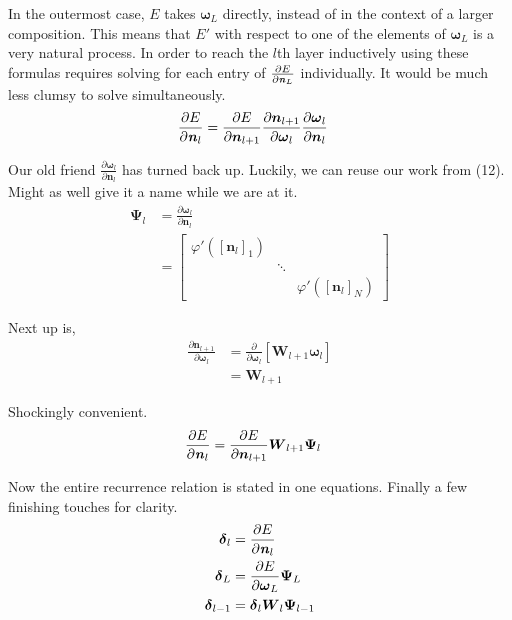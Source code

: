 \documentclass[12pt,letterpaper]{article}
\begin{document}
In the outermost case, $E$ takes $\boldsymbol{\omega}_L$ directly, instead of in the context of a larger composition.  This means that $E'$ with respect to one of the elements of $\boldsymbol{\omega}_L$ is a very natural process.  In order to reach the $l$th layer inductively using these formulas requires solving for each entry of 
$\frac{\partial E}{ \partial \textbf{\textit{n}}_L }$
individually.  It would be much less clumsy to solve simultaneously.
\begin{align}
\frac{\partial E}{ \partial \textbf{\textit{n}}_l } 
&= 
\frac{\partial E}{\partial \boldsymbol{n}_{l+1}}
\frac{\partial \boldsymbol{n}_{l+1}}{ \partial \boldsymbol{\omega}_l }
\frac{\partial \boldsymbol{\omega}_l }{ \partial \boldsymbol{n}_l }
\end{align}

Our old friend 
$\frac{\partial \boldsymbol{\omega}_l }{ \partial \boldsymbol{n}_l }$
has turned back up.  Luckily, we can reuse our work from (12).  Might as well give it a name while we are at it.
\begin{align}
\boldsymbol{\Psi}_l
&= 
\frac{\partial \boldsymbol{\omega}_l }{ \partial \boldsymbol{n}_l } \\
&=
\begin{bmatrix}
\varphi'(\left[\boldsymbol{n}_l\right]_1) & \\ 
& \ddots &\\ 
& & \varphi'(\left[\boldsymbol{n}_l\right]_N)
\end{bmatrix}
\end{align}

Next up is,
\begin{align}
\frac{\partial \boldsymbol{n}_{l+1}}{ \partial \boldsymbol{\omega}_l }
&= 
\frac{\partial }{ \partial \boldsymbol{\omega}_l } 
\left[ 
\boldsymbol{W}_{l+1} \boldsymbol{\omega}_l
\right] \\
&=
\boldsymbol{W}_{l+1}
\end{align}

Shockingly convenient.
\begin{align}
\frac{\partial E}{ \partial \textbf{\textit{n}}_l } 
&= 
\frac{\partial E}{\partial \boldsymbol{n}_{l+1}}
\boldsymbol{W}_{l+1}
\boldsymbol{\Psi}_l
\end{align}

Now the entire recurrence relation is stated in one equations.  Finally a few finishing touches for clarity.
\begin{align}
\boldsymbol{\delta}_l 
&=
\frac{\partial E}{ \partial \textbf{\textit{n}}_l } \\
\boldsymbol{\delta}_L
&=
\frac{\partial E}{\partial \boldsymbol{\omega}_{L}}
\boldsymbol{\Psi}_L \\
\boldsymbol{\delta}_{l-1}
&= 
\boldsymbol{\delta}_l
\boldsymbol{W}_l
\boldsymbol{\Psi}_{l-1}
\end{align} 
\end{document}
